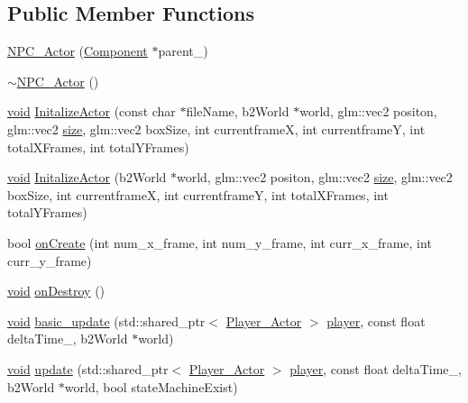 \subsection*{Public Member Functions}
\begin{DoxyCompactItemize}
\item 
\hyperlink{classNPC__Actor_aa87fc7f9fb6487b746f3df4e1ab4af18}{N\+P\+C\+\_\+\+Actor} (\hyperlink{classComponent}{Component} $\ast$parent\+\_\+)
\item 
\hyperlink{classNPC__Actor_a5bb0ec8906e74ae2d5809da099a9ae00}{$\sim$\+N\+P\+C\+\_\+\+Actor} ()
\item 
\hyperlink{imgui__impl__opengl3__loader_8h_ac668e7cffd9e2e9cfee428b9b2f34fa7}{void} \hyperlink{classNPC__Actor_aee175ed98d287e0c15202d9db34ead24}{Initalize\+Actor} (const char $\ast$file\+Name, b2\+World $\ast$world, glm\+::vec2 positon, glm\+::vec2 \hyperlink{imgui__impl__opengl3__loader_8h_a3d1e3edfcf61ca2d831883e1afbad89e}{size}, glm\+::vec2 box\+Size, int currentframeX, int currentframeY, int total\+X\+Frames, int total\+Y\+Frames)
\item 
\hyperlink{imgui__impl__opengl3__loader_8h_ac668e7cffd9e2e9cfee428b9b2f34fa7}{void} \hyperlink{classNPC__Actor_a4549d7c33e0e1fb711b1c2d42f651c00}{Initalize\+Actor} (b2\+World $\ast$world, glm\+::vec2 positon, glm\+::vec2 \hyperlink{imgui__impl__opengl3__loader_8h_a3d1e3edfcf61ca2d831883e1afbad89e}{size}, glm\+::vec2 box\+Size, int currentframeX, int currentframeY, int total\+X\+Frames, int total\+Y\+Frames)
\item 
bool \hyperlink{classNPC__Actor_a290c88cbf6fb977dd5084d0ee75ba34b}{on\+Create} (int num\+\_\+x\+\_\+frame, int num\+\_\+y\+\_\+frame, int curr\+\_\+x\+\_\+frame, int curr\+\_\+y\+\_\+frame)
\item 
\hyperlink{imgui__impl__opengl3__loader_8h_ac668e7cffd9e2e9cfee428b9b2f34fa7}{void} \hyperlink{classNPC__Actor_ab274d0517bd0cd710efc7df31cd7450b}{on\+Destroy} ()
\item 
\hyperlink{imgui__impl__opengl3__loader_8h_ac668e7cffd9e2e9cfee428b9b2f34fa7}{void} \hyperlink{classNPC__Actor_a6d4175597b53261419a5e60d4dd486cb}{basic\+\_\+update} (std\+::shared\+\_\+ptr$<$ \hyperlink{classPlayer__Actor}{Player\+\_\+\+Actor} $>$ \hyperlink{game__play__state_8cpp_ac65a4bc85dcd7c1cefbc84425f42fc46}{player}, const float delta\+Time\+\_\+, b2\+World $\ast$world)
\item 
\hyperlink{imgui__impl__opengl3__loader_8h_ac668e7cffd9e2e9cfee428b9b2f34fa7}{void} \hyperlink{classNPC__Actor_a8bfe3a4223330ef3911d3cea91fff6cd}{update} (std\+::shared\+\_\+ptr$<$ \hyperlink{classPlayer__Actor}{Player\+\_\+\+Actor} $>$ \hyperlink{game__play__state_8cpp_ac65a4bc85dcd7c1cefbc84425f42fc46}{player}, const float delta\+Time\+\_\+, b2\+World $\ast$world, bool state\+Machine\+Exist)

\end{DoxyCompactItemize}
